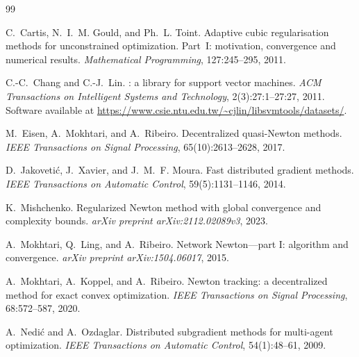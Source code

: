 \documentclass[11pt,a4paper]{article}
\begin{document}


	\begin{thebibliography}{99}
		
		C.~Cartis, N.~I.~M. Gould, and Ph.~L. Toint.
		\newblock Adaptive cubic regularisation methods for unconstrained optimization. Part~I: motivation, convergence and numerical results.
		\newblock \emph{Mathematical Programming}, 127:245--295, 2011.
		
		C.-C.~Chang and C.-J.~Lin.
		: a library for support vector machines.
		\newblock \emph{ACM Transactions on Intelligent Systems and Technology}, 2(3):27:1--27:27, 2011.
		\newblock Software available at \url{https://www.csie.ntu.edu.tw/~cjlin/libsvmtools/datasets/}.
		
		M.~Eisen, A.~Mokhtari, and A.~Ribeiro.
		\newblock Decentralized quasi-{N}ewton methods.
		\newblock \emph{IEEE Transactions on Signal Processing}, 65(10):2613--2628, 2017.
		
		D.~Jakoveti{\'c}, J.~Xavier, and J.~M.~F. Moura.
		\newblock Fast distributed gradient methods.
		\newblock \emph{IEEE Transactions on Automatic Control}, 59(5):1131--1146, 2014.
		
		K.~Mishchenko.
		\newblock Regularized {N}ewton method with global convergence and complexity bounds.
		\newblock \emph{arXiv preprint arXiv:2112.02089v3}, 2023.
		
		A.~Mokhtari, Q.~Ling, and A.~Ribeiro.
		\newblock Network {N}ewton---part {I}: algorithm and convergence.
		\newblock \emph{arXiv preprint arXiv:1504.06017}, 2015.
		
		A.~Mokhtari, A.~Koppel, and A.~Ribeiro.
		\newblock Newton tracking: a decentralized method for exact convex optimization.
		\newblock \emph{IEEE Transactions on Signal Processing}, 68:572--587, 2020.
		
		A.~Nedi{\'c} and A.~Ozdaglar.
		\newblock Distributed subgradient methods for multi-agent optimization.
		\newblock \emph{IEEE Transactions on Automatic Control}, 54(1):48--61, 2009.
		

\end{thebibliography}
\end{document}

